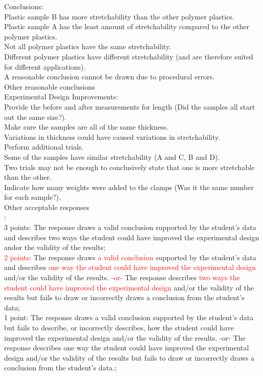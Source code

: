 \begin{figure*}
\begin{tcolorbox}[
    colback=gray!10,      %
    colframe=gray!80,     %
    title=Case Study 4,
    fonttitle=\bfseries,  %
    rounded corners,
    boxrule=0.5mm,        %
    width=\linewidth
]
Conclusions:\\
Plastic sample B has more stretchability than the other polymer plastics.\\
Plastic sample A has the least amount of stretchability compared to the other polymer plastics.\\
Not all polymer plastics have the same stretchability.\\
Different polymer plastics have different stretchability (and are therefore suited for different applications).\\
A reasonable conclusion cannot be drawn due to procedural errors.\\
Other reasonable conclusions \\
Experimental Design Improvements:\\
Provide the before and after measurements for length (Did the samples all start out the same size?).\\
Make sure the samples are all of the same thickness.\\
Variations in thickness could have caused variations in stretchability.\\
Perform additional trials.\\
Some of the samples have similar stretchability (A and C, B and D).\\
Two trials may not be enough to conclusively state that one is more stretchable than the other.\\
Indicate how many weights were added to the clamps (Was it the same number for each sample?).\\
Other acceptable responses\\
:\\
3 points: The response draws a valid conclusion supported by the student's data and describes two ways the student could have improved the experimental design and\/or the validity of the results;\\
\textcolor{red}{2 points}: The response draws \textcolor{red}{a valid conclusion} supported by the student's data and describes \textcolor{red}{one way the student could have improved the experimental design} and/or the validity of the results. \textcolor{red}{-or-} The response describes \textcolor{red}{two ways the student could have improved the experimental design} and/or the validity of the results but fails to draw or incorrectly draws a conclusion from the student's data;\\
1 point: The response draws a valid conclusion supported by the student's data but fails to describe, or incorrectly describes, how the student could have improved the experimental design and/or the validity of the results. -or- The response describes one way the student could have improved the experimental design and/or the validity of the results but fails to draw or incorrectly draws a conclusion from the student's data.;\\

\end{tcolorbox}
\end{figure*}
